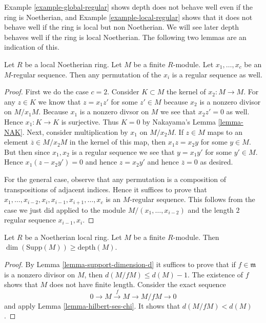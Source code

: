 \noindent
Example \ref{example-global-regular} shows depth does not
behave well even if the ring is Noetherian, and Example
\ref{example-local-regular} shows that it does not
behave well if the ring is local but non Noetherian.
We will see later depth behaves well if the ring is local
Noetherian. The following two lemmas are an indication of this.

\begin{lemma}
\label{lemma-permute-xi}
Let $R$ be a local Noetherian ring.
Let $M$ be a finite $R$-module.
Let $x_1, \ldots, x_c$ be an $M$-regular sequence.
Then any permutation of the $x_i$ is a regular
sequence as well.
\end{lemma}

\begin{proof}
First we do the case $c = 2$.
Consider $K \subset M$ the kernel of $x_2 : M \to M$.
For any $z \in K$ we know that $z = x_1 z'$
for some $z' \in M$ because
$x_2$ is a nonzero divisor on $M/x_1M$.
Because $x_1$ is a nonzero divsor on $M$ we see that $x_2 z' = 0$
as well. Hence $x_1 : K \to K$ is surjective.
Thus $K = 0$ by Nakayama's Lemma \ref{lemma-NAK}.
Next, consider multiplication by $x_1$ on $M/x_2M$.
If $z \in M$ maps to an element $\overline{z} \in M/x_2M$
in the kernel of this map, then $x_1 z = x_2 y$ for some $y \in M$.
But then since $x_1, x_2$ is a regular sequence we see that
$y = x_1 y'$ for some $y' \in M$. Hence $x_1 ( z - x_2 y' ) =0$
and hence $z = x_2 y'$ and hence $\overline{z} = 0$ as desired.

\medskip\noindent
For the general case, observe that any permutation is
a composition of transpositions of adjacent indices.
Hence it suffices to prove that
$x_1, \ldots, x_{i-2}, x_i, x_{i-1}, x_{i + 1}, \ldots, x_c$
is an $M$-regular sequence. This follows from the case we
just did applied to the module $M/(x_1, \ldots, x_{i-2})$
and the length $2$ regular sequence $x_{i-1}, x_i$.
\end{proof}

\begin{lemma}
\label{lemma-bound-depth}
Let $R$ be a Noetherian local ring.
Let $M$ be a finite $R$-module.
Then $\dim(\text{Supp}(M)) \geq \text{depth}(M)$.
\end{lemma}

\begin{proof}
By Lemma \ref{lemma-support-dimension-d} it suffices
to prove that if $f \in \mathfrak m$ is a nonzero
divisor on $M$, then $d(M/fM) \leq d(M) - 1$.
The existence of $f$ shows that $M$ does not have finite length.
Consider the exact sequence
$$
0 \to M \xrightarrow{f} M \to M/fM \to 0
$$
and apply Lemma \ref{lemma-hilbert-ses-chi}.
It shows that $d(M/fM) < d(M)$.
\end{proof}

